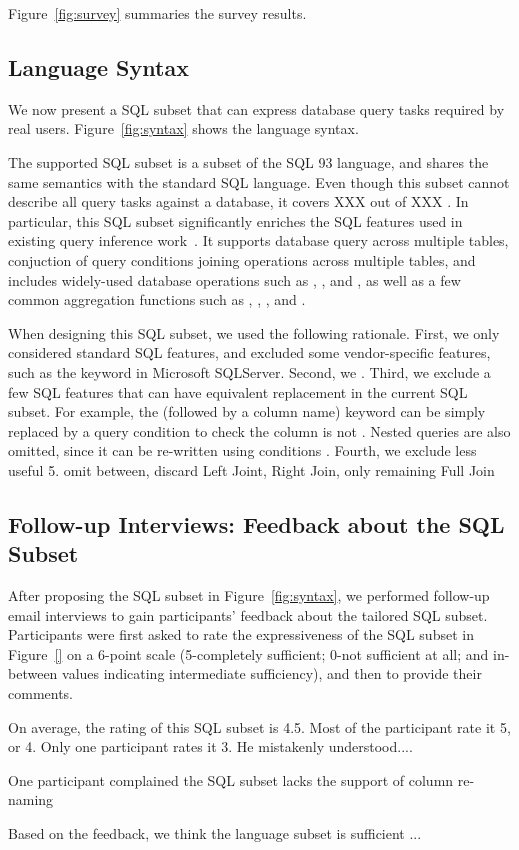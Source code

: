 Figure~\ref{fig:survey} summaries the survey results.

\subsection{Language Syntax}
\label{sec:syntax}

We now present a SQL subset that can express database query
tasks required by real users. Figure~\ref{fig:syntax} shows
the language syntax.


The supported SQL subset is a subset of the SQL 93
language, and shares the same semantics with the standard
SQL language.  Even though this subset cannot describe all query
tasks against a database, it covers XXX out of XXX 
. In particular, this SQL subset significantly
enriches the SQL features used in existing query inference
work~\cite{DasSarma:2010}.  It supports database query
across multiple tables, conjuction of query conditions
joining operations across multiple tables, and includes
widely-used database operations such as ,
, and , as
well as a few common aggregation functions such as , ,
, and .

When designing this SQL subset, we used the following rationale.
First, we only considered standard SQL features, and excluded
some vendor-specific features, such as the  keyword
in Microsoft SQLServer. Second, we . Third, we exclude
a few SQL features that can have equivalent replacement 
in the current SQL subset. For example, the  (followed
by a column name) keyword can be simply replaced by a
query condition to check the column is not .
Nested queries are also omitted, since it can be re-written
using conditions .
Fourth, we exclude less useful
5. omit between, discard Left Joint, Right Join, only remaining Full Join



\subsection{Follow-up Interviews: Feedback about the SQL Subset}
\label{sec:interview}

After proposing the SQL subset in Figure~\ref{fig:syntax},
we performed follow-up email interviews to gain
participants' feedback about the tailored SQL
subset. Participants were first asked to rate
the expressiveness of the SQL subset in Figure~\ref{}
on a 6-point scale (5-completely sufficient; 0-not sufficient at all;
and in-between values indicating intermediate sufficiency),
and then to provide their comments.

On average, the rating of this SQL subset is 4.5. Most of
the participant rate it 5, or 4. Only one participant rates
it 3. He mistakenly understood....\todo{}

One participant complained the SQL subset lacks the support
of column re-naming

Based on the feedback, we think the language subset is
sufficient ...


